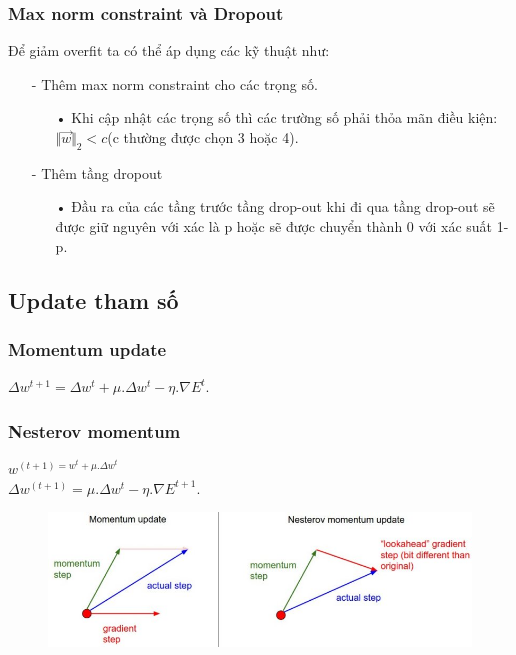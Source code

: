 \documentclass[a4paper,12pt]{report}
\begin{document}
\subsubsection{Max norm constraint và Dropout}
Để giảm overfit ta có thể áp dụng các kỹ thuật như:
\begin{itemize}
\item[-] Thêm max norm constraint cho các trọng số.
\begin{itemize}
\item[•] Khi cập nhật các trọng số thì các trường số phải thỏa mãn điều kiện: \\ 
 $\Vert\overrightarrow{w}\Vert_{2} < c$(c thường được chọn 3 hoặc 4). 
\end{itemize}
\item[-] Thêm tầng dropout
\begin{itemize}
\item[•] Đầu ra của các tầng trước tầng drop-out khi đi qua tầng drop-out sẽ được giữ nguyên với xác là p hoặc sẽ được chuyển thành 0 với xác suất 1-p.
\end{itemize} 
\end{itemize}
\subsection{Update tham số}
\subsubsection{Momentum update}
$\Delta w^{t+1} = \Delta w^{t} + \mu .\Delta w^{t} - \eta . \nabla E^t$.
\subsubsection{Nesterov momentum}
$w^{(t+1) = w^{t} + \mu . \Delta w^t}$ \\
$\Delta w^{(t+1)} = \mu . \Delta w^t - \eta . \nabla E^{t+1}$.
\begin{figure}[h]
\begin{center}
\includegraphics[width =0.8 \textwidth]{paramUpdate.jpeg}
\end{center}
\end{figure}
\end{document}
